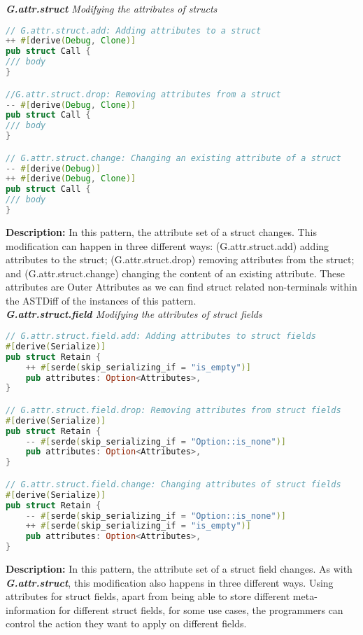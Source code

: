 \noindent \textit{\label{sec:G.attr.struct}\textbf{G.attr.struct} Modifying the attributes of structs}

\begin{lstlisting}[language=Rust, style=colouredRust]
// G.attr.struct.add: Adding attributes to a struct
++ #[derive(Debug, Clone)]
pub struct Call {
/// body 
}

//G.attr.struct.drop: Removing attributes from a struct
-- #[derive(Debug, Clone)]
pub struct Call {
/// body 
}

// G.attr.struct.change: Changing an existing attribute of a struct
-- #[derive(Debug)]
++ #[derive(Debug, Clone)]
pub struct Call {
/// body 
}
\end{lstlisting}

\noindent \textbf{Description:} In this pattern, the attribute set of a struct changes. This modification can happen in three different ways: (G.attr.struct.add) adding attributes to the struct; (G.attr.struct.drop) removing attributes from the struct; and (G.attr.struct.change) changing the content of an existing attribute. These attributes are Outer Attributes as we can find struct related non-terminals within the ASTDiff of the instances of this pattern. \\

\noindent \textit{ \textbf{G.attr.struct.field} Modifying the attributes of struct fields}

\begin{lstlisting}[language=Rust, style=colouredRust]
// G.attr.struct.field.add: Adding attributes to struct fields
#[derive(Serialize)]
pub struct Retain {
    ++ #[serde(skip_serializing_if = "is_empty")]
    pub attributes: Option<Attributes>,
}

// G.attr.struct.field.drop: Removing attributes from struct fields
#[derive(Serialize)]
pub struct Retain {
    -- #[serde(skip_serializing_if = "Option::is_none")]
    pub attributes: Option<Attributes>,
}

// G.attr.struct.field.change: Changing attributes of struct fields
#[derive(Serialize)]
pub struct Retain {
    -- #[serde(skip_serializing_if = "Option::is_none")]
    ++ #[serde(skip_serializing_if = "is_empty")]
    pub attributes: Option<Attributes>,
}
\end{lstlisting}

\noindent \textbf{Description:} In this pattern, the attribute set of a struct field changes. As with \textit{\textbf{G.attr.struct}}, this modification also happens in three different ways. Using attributes for struct fields, apart from being able to store different meta-information for different struct fields, for some use cases, the programmers can control the action they want to apply on different fields.

